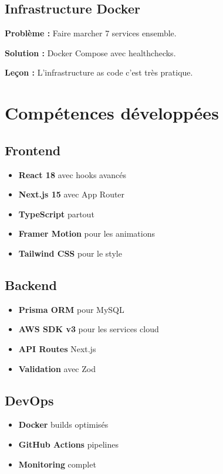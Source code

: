 \documentclass[12pt,a4paper]{report}
\begin{document}
\subsection{Infrastructure Docker}
\textbf{Problème :} Faire marcher 7 services ensemble.

\textbf{Solution :} Docker Compose avec healthchecks.

\textbf{Leçon :} L'infrastructure as code c'est très pratique.

\section{Compétences développées}

\subsection{Frontend}
\begin{itemize}
    \item \textbf{React 18} avec hooks avancés
    \item \textbf{Next.js 15} avec App Router
    \item \textbf{TypeScript} partout
    \item \textbf{Framer Motion} pour les animations
    \item \textbf{Tailwind CSS} pour le style
\end{itemize}

\subsection{Backend}
\begin{itemize}
    \item \textbf{Prisma ORM} pour MySQL
    \item \textbf{AWS SDK v3} pour les services cloud
    \item \textbf{API Routes} Next.js
    \item \textbf{Validation} avec Zod
\end{itemize}

\subsection{DevOps}
\begin{itemize}
    \item \textbf{Docker} builds optimisés
    \item \textbf{GitHub Actions} pipelines
    \item \textbf{Monitoring} complet
\end{itemize}
\end{document}
